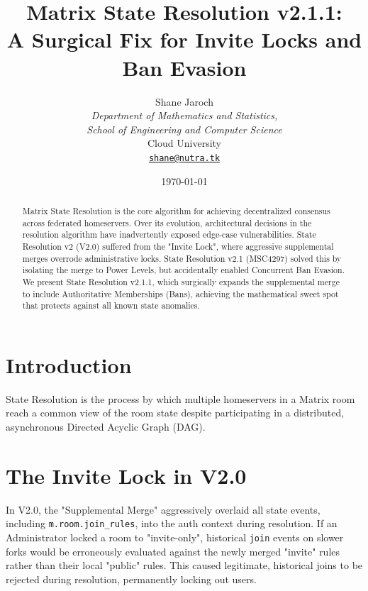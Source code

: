 \documentclass[12pt]{article}
\title{Matrix State Resolution v2.1.1: \\ A Surgical Fix for Invite Locks and Ban Evasion}
\author{%
  Shane Jaroch \\
  \small \textit{Department of Mathematics and Statistics,} \\
  \small \textit{School of Engineering and Computer Science} \\
  \small Cloud University \\
  \small \href{mailto:shane@nutra.tk}{\texttt{shane@nutra.tk}}
}
\date{\today}
\begin{document}
\maketitle

\begin{abstract}
Matrix State Resolution is the core algorithm for achieving decentralized consensus across federated homeservers. Over its evolution, architectural decisions in the resolution algorithm have inadvertently exposed edge-case vulnerabilities. State Resolution v2 (V2.0) suffered from the "Invite Lock", where aggressive supplemental merges overrode administrative locks. State Resolution v2.1 (MSC4297) solved this by isolating the merge to Power Levels, but accidentally enabled Concurrent Ban Evasion. We present State Resolution v2.1.1, which surgically expands the supplemental merge to include Authoritative Memberships (Bans), achieving the mathematical sweet spot that protects against all known state anomalies.
\end{abstract}

\section{Introduction}
State Resolution is the process by which multiple homeservers in a Matrix room reach a common view of the room state despite participating in a distributed, asynchronous Directed Acyclic Graph (DAG).

\section{The Invite Lock in V2.0}
In V2.0, the "Supplemental Merge" aggressively overlaid all state events, including \texttt{m.room.join\_rules}, into the auth context during resolution.
If an Administrator locked a room to "invite-only", historical \texttt{join} events on slower forks would be erroneously evaluated against the newly merged "invite" rules rather than their local "public" rules. This caused legitimate, historical joins to be rejected during resolution, permanently locking out users.
\end{document}
